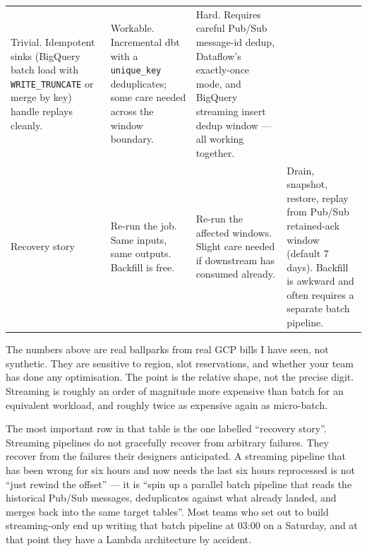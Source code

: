 \documentclass[
  11pt,
  british,
  oneside]{book}
\begin{document}
\begin{longtable}[]{@{}llll@{}}
\begin{minipage}[t]{0.22\columnwidth}
Trivial. Idempotent sinks (BigQuery batch load with
\texttt{WRITE\_TRUNCATE} or merge by key) handle replays cleanly.\strut
\end{minipage} & \begin{minipage}[t]{0.22\columnwidth}\raggedright
Workable. Incremental dbt with a \texttt{unique\_key} deduplicates; some
care needed across the window boundary.\strut
\end{minipage} & \begin{minipage}[t]{0.22\columnwidth}\raggedright
Hard. Requires careful Pub/Sub message-id dedup, Dataflow's exactly-once
mode, and BigQuery streaming insert dedup window --- all working
together.\strut
\end{minipage}\tabularnewline
\begin{minipage}[t]{0.22\columnwidth}\raggedright
Recovery story\strut
\end{minipage} & \begin{minipage}[t]{0.22\columnwidth}\raggedright
Re-run the job. Same inputs, same outputs. Backfill is free.\strut
\end{minipage} & \begin{minipage}[t]{0.22\columnwidth}\raggedright
Re-run the affected windows. Slight care needed if downstream has
consumed already.\strut
\end{minipage} & \begin{minipage}[t]{0.22\columnwidth}\raggedright
Drain, snapshot, restore, replay from Pub/Sub retained-ack window
(default 7 days). Backfill is awkward and often requires a separate
batch pipeline.\strut
\end{minipage}\tabularnewline
\bottomrule
\end{longtable}

The numbers above are real ballparks from real GCP bills I have seen,
not synthetic. They are sensitive to region, slot reservations, and
whether your team has done any optimisation. The point is the relative
shape, not the precise digit. Streaming is roughly an order of magnitude
more expensive than batch for an equivalent workload, and roughly twice
as expensive again as micro-batch.

The most important row in that table is the one labelled ``recovery
story''. Streaming pipelines do not gracefully recover from arbitrary
failures. They recover from the failures their designers anticipated. A
streaming pipeline that has been wrong for six hours and now needs the
last six hours reprocessed is not ``just rewind the offset'' --- it is
``spin up a parallel batch pipeline that reads the historical Pub/Sub
messages, deduplicates against what already landed, and merges back into
the same target tables''. Most teams who set out to build streaming-only
end up writing that batch pipeline at 03:00 on a Saturday, and at that
point they have a Lambda architecture by accident.
\end{document}
